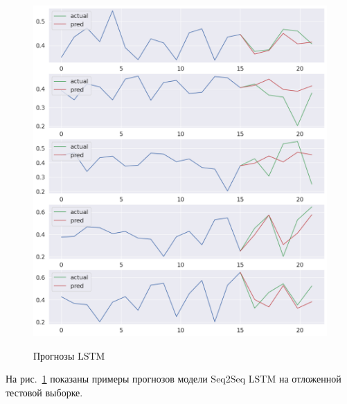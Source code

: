 \begin{figure}[H]\center
{\includegraphics[width=1.0\textwidth]{results/example_lstm.png}}
\caption{Прогнозы LSTM}
\label{example_lstm}
\end{figure}

На рис.~\ref{example_lstm} показаны примеры прогнозов модели Seq2Seq LSTM на отложенной тестовой выборке.

\newpage

